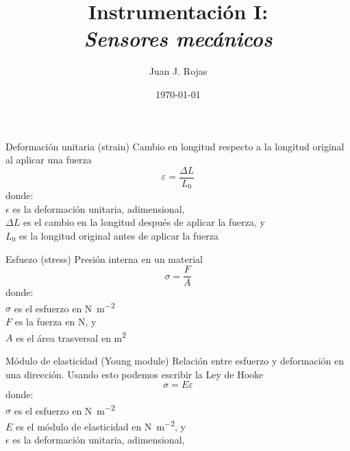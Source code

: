 \documentclass[aspectratio=169]{beamer}
\title{Instrumentación I: \\ \emph{Sensores mecánicos}}
\author{
    Juan J. Rojas
}
\institute{Instituto Tecnológico de Costa Rica}
\date{\today}
\begin{document}

\maketitle



\newcommand{\blackandwhite}{white} %

\begin{frame}[t]{Deformación unitaria (strain)}
    Cambio en longitud respecto a la longitud original al aplicar una fuerza
    \vspace{0.5cm}
    \begin{equation*}
        \varepsilon = \dfrac{\Delta L }{L_0}
    \end{equation*}
    donde:\\
    $\epsilon$ es la deformación unitaria, adimensional,\\
    $\Delta L$ es el cambio en la longitud después de aplicar la fuerza, y\\ 
    $L_0$ es la longitud original antes de aplicar la fuerza
\end{frame}

\begin{frame}[t]{Esfuezo (stress)}
    Presión interna en un material
    \vspace{0.5cm}
    \begin{equation*}
        \sigma = \dfrac{F}{A}
    \end{equation*}
    donde:\\
    $\sigma$ es el esfuerzo en \si{\newton\meter^{-2}}\\
    $F$ es la fuerza en \si{\newton}, y\\ 
    $A$ es el área trasversal en  \si{\meter^{2}}
\end{frame}

\begin{frame}[t]{Módulo de elasticidad (Young module)}
    Relación entre esfuerzo y deformación en una dirección. Usando esto podemos escribir la Ley de Hooke
    \vspace{0.5cm}
    \begin{equation*}
        \sigma = E\varepsilon
    \end{equation*}
    donde:\\
    $\sigma$ es el esfuerzo en \si{\newton\meter^{-2}}\\
    $E$ es el módulo de elasticidad en \si{\newton\meter^{-2}}, y\\ 
    $\epsilon$ es la deformación unitaria, adimensional,\\
\end{frame}
\end{document}
